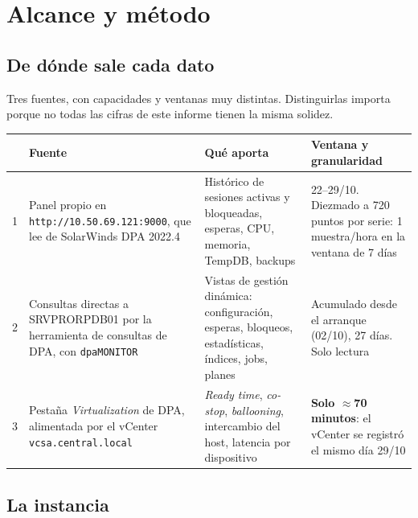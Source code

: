 \documentclass[11pt,a4paper]{article}
\newcommand{\cod}[1]{\texttt{\small #1}}
\newcommand{\critico}[1]{\textcolor{rojo}{\textbf{#1}}}
\begin{document}
\section{Alcance y método}

\subsection{De dónde sale cada dato}

Tres fuentes, con capacidades y ventanas muy distintas. Distinguirlas importa
porque no todas las cifras de este informe tienen la misma solidez.

\begin{longtable}{p{0.4cm}p{4.3cm}p{5.1cm}p{5.4cm}}
\toprule
& \textbf{Fuente} & \textbf{Qué aporta} & \textbf{Ventana y granularidad} \\
\midrule
\endhead
1 & Panel propio en
    \cod{http://10.50.69.121:9000}, que lee de SolarWinds DPA 2022.4
  & Histórico de sesiones activas y bloqueadas, esperas, CPU, memoria,
    TempDB, backups
  & 22--29/10. Diezmado a 720 puntos por serie: 1 muestra/hora en la ventana
    de 7 días \\
2 & Consultas directas a SRVPRORPDB01 por la herramienta de consultas de DPA,
    con \cod{dpaMONITOR}
  & Vistas de gestión dinámica: configuración, esperas, bloqueos,
    estadísticas, índices, jobs, planes
  & Acumulado desde el arranque (02/10), 27 días. Solo lectura \\
3 & Pestaña \emph{Virtualization} de DPA, alimentada por el vCenter
    \cod{vcsa.central.local}
  & \emph{Ready time}, \emph{co-stop}, \emph{ballooning}, intercambio del
    host, latencia por dispositivo
  & \critico{Solo $\approx$70 minutos}: el vCenter se registró el mismo día
    29/10 \\
\bottomrule
\end{longtable}

\subsection{La instancia}
\end{document}
